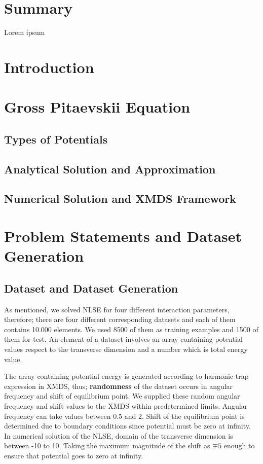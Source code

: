 \documentclass[a4paper,times,12pt]{article}
\title{}%
\date{}
\begin{document}
\setcounter{page}{1}

\section*{Summary}
Lorem ipsum
\section{Introduction}
\section{Gross Pitaevskii Equation}
\subsection{Types of Potentials}
\subsection{Analytical Solution and Approximation}
\subsection{Numerical Solution and XMDS Framework}
\section{Problem Statements and Dataset Generation}

\subsection{Dataset and Dataset Generation}

As mentioned, we solved NLSE for four different interaction parameters, therefore; there are four different corresponding datasets and each of them contains 10.000 elements. We used 8500 of them as training examples and 1500 of them for test. An element of a dataset involves an array containing potential values respect to the transverse dimension and a number which is total energy value.

The array containing potential energy is generated according to harmonic trap expression in XMDS, thus; \textbf{randomness} of the dataset occurs in angular frequency and shift of equilibrium point. We supplied these random angular frequency and shift values to the XMDS within predetermined limits. Angular frequency can take values between 0.5 and 2. Shift of the equilibrium point is determined due to boundary conditions since potential must be zero at infinity. In numerical solution of the NLSE, domain of the transverse dimension is between -10 to 10. Taking the maximum magnitude of the shift as $\mp 5$ enough to ensure that potential goes to zero at infinity.
\end{document}
